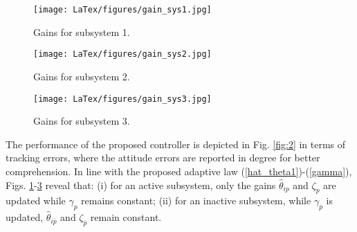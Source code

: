 \begin{figure}[!h]
	\centering
	\texttt{[image: LaTex/figures/gain\_sys1.jpg]}%
	\caption{{Gains for subsystem 1.}}\label{fig:3} %
\end{figure}
\begin{figure}[!h]
	\centering
	\texttt{[image: LaTex/figures/gain\_sys2.jpg]}%
	\caption{{Gains for subsystem 2.}}\label{fig:4} %
\end{figure}
\begin{figure}[!h]
	\centering
	\texttt{[image: LaTex/figures/gain\_sys3.jpg]}%
	\caption{{Gains for subsystem 3.}}\label{fig:5} %
\end{figure}

The performance of the proposed controller is depicted in Fig. \ref{fig:2} in terms of tracking errors, where the attitude errors are reported in degree for better comprehension. In line with the proposed adaptive law (\ref{hat_theta1})-(\ref{gamma}), Figs. \ref{fig:3}-\ref{fig:5} reveal that: (i) for an active subsystem, only the gains $\hat{\theta}_{i {p}}$ and $\zeta_p$ are updated while $\gamma_{p}$ remains constant; (ii) for an inactive subsystem, while $\gamma_{\overline{p}}$ is updated, $\hat{\theta}_{i \overline{p}}$ and $\zeta_{\overline p}$ remain constant. %
